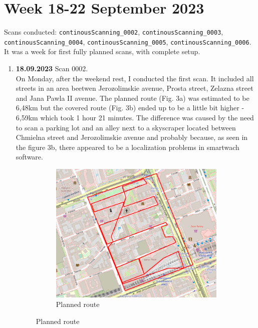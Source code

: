 \documentclass[a4paper,12pt]{article}
\begin{document}
\section{Week 18-22 September 2023}
Scans conducted: \verb|continousScanning_0002|, \verb|continousScanning_0003|, \verb|continousScanning_0004|, \verb|continousScanning_0005|, \verb|continousScanning_0006|.\\
It was a week for first fully planned scans, with complete setup. 
\begin{enumerate}
	\item \textbf{18.09.2023} Scan 0002. \\
	On Monday, after the weekend rest, I conducted the first scan. It included all streets in an area beetwen Jerozolimskie avenue, Prosta street, Zelazna street and Jana Pawla II avenue. The planned route (Fig. 3a) was estimated to be 6,48km but the covered route (Fig. 3b) ended up to be a little bit higher - 6,59km which took 1 hour 21 minutes. The difference was caused by the need to scan a parking lot and an alley next to a skyscraper located between Chmielna street and Jerozolimskie avenue and probably because, as seen in the figure 3b, there appeared to be a localization problems in smartwach software.
	\begin{figure}[H]
		\centering
		\begin{subfigure}{.90\textwidth}
			\centering
			\includegraphics[width=1\linewidth]{route_p2}
			\caption{Planned route}
			\label{fig:a2}
		\end{subfigure}%
		\linebreak

\end{figure}
\end{enumerate}
\end{document}

